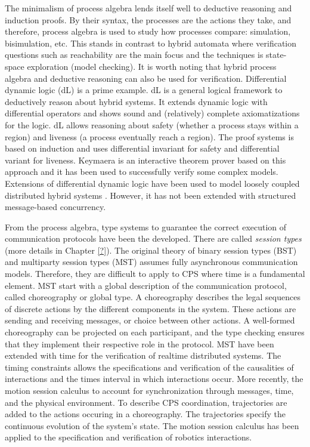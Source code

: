 \documentclass[
graybox,
envcountchap
]{svmult}
\begin{document}
\begin{bibunit}
The minimalism of process algebra lends itself well to deductive reasoning and induction proofs.
By their syntax, the processes are the actions they take, and therefore, process algebra is used to study how processes compare: simulation, bisimulation, etc.
This stands in contrast to hybrid automata where verification questions such as reachability are the main focus and the techniques is state-space exploration (model checking).
%
It is worth noting that hybrid process algebra and deductive reasoning can also be used for verification.
Differential dynamic logic (dL) \cite{PlatzerBook,Platzer18,PlatzerT18} is a prime example.
dL is a general logical framework to deductively reason about hybrid systems.
It extends dynamic logic with differential operators and shows sound and (relatively) complete axiomatizations for the logic.
dL allows reasoning about safety (whether a process stays within a region) and liveness (a process eventually reach a region).
The proof systems is based on induction and uses differential invariant for safety and differential variant for liveness.
Keymaera \cite{QueselMLAP16} is an interactive theorem prover based on this approach and it has been used to successfully verify some complex models.
Extensions of differential dynamic logic have been used to model loosely coupled distributed hybrid systems \cite{Platzer12}.
However, it has not been extended with structured message-based concurrency.


From the process algebra, type systems to guarantee the correct execution of communication protocols have been the developed.
There are called \emph{session types} (more details in Chapter \ref{?}). 
The original theory of binary session types (BST) \cite{DBLP:conf/esop/HondaVK98} and multiparty session types (MST) \cite{DBLP:journals/jacm/HondaYC16} assumes fully asynchronous communication models.
Therefore, they are difficult to apply to CPS where time is a fundamental element.
%
MST start with a global description of the communication protocol, called choreography or global type.
A choreography describes the legal sequences of discrete actions by the different components in the system.
These actions are sending and receiving messages, or choice between other actions.
A well-formed choreography can be projected on each participant, and the type checking ensures that they implement their respective role in the protocol.
%
MST have been extended with time \cite{DBLP:conf/concur/BocchiYY14,DBLP:conf/esop/BocchiMVY19} for the verification of realtime distributed systems.
The timing constraints allows the specifications and verification of the causalities of interactions and the times interval in which interactions occur.
More recently, the motion session calculus \cite{DBLP:conf/ecoop/MajumdarPYZ19} to account for synchronization through messages, time, and the physical environment.
To describe CPS coordination, trajectories are added to the actions occuring in a choreography.
The trajectories specify the continuous evolution of the system's state.
The motion session calculus has been applied to the specification and verification of robotics interactions.


\end{bibunit}
\end{document}
